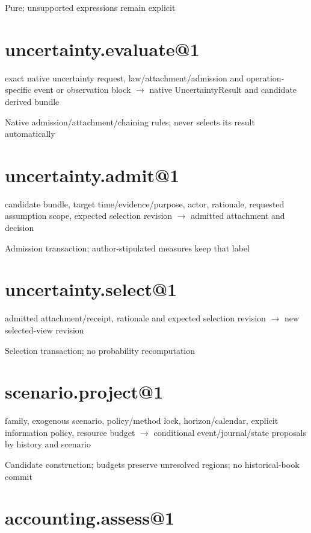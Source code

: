 Pure; unsupported expressions remain explicit

\hypertarget{uncertainty.evaluate1}{%
\section{uncertainty.evaluate@1}\label{uncertainty.evaluate1}}

exact native uncertainty request, law/attachment/admission and operation-specific event or observation block \ensuremath{\rightarrow} native UncertaintyResult and candidate derived bundle

Native admission/attachment/chaining rules; never selects its result automatically

\hypertarget{uncertainty.admit1}{%
\section{uncertainty.admit@1}\label{uncertainty.admit1}}

candidate bundle, target time/evidence/purpose, actor, rationale, requested assumption scope, expected selection revision \ensuremath{\rightarrow} admitted attachment and decision

Admission transaction; author-stipulated measures keep that label

\hypertarget{uncertainty.select1}{%
\section{uncertainty.select@1}\label{uncertainty.select1}}

admitted attachment/receipt, rationale and expected selection revision \ensuremath{\rightarrow} new selected-view revision

Selection transaction; no probability recomputation

\hypertarget{scenario.project1}{%
\section{scenario.project@1}\label{scenario.project1}}

family, exogenous scenario, policy/method lock, horizon/calendar, explicit information policy, resource budget \ensuremath{\rightarrow} conditional event/journal/state proposals by history and scenario

Candidate construction; budgets preserve unresolved regions; no historical-book commit

\hypertarget{accounting.assess1}{%
\section{accounting.assess@1}\label{accounting.assess1}}

